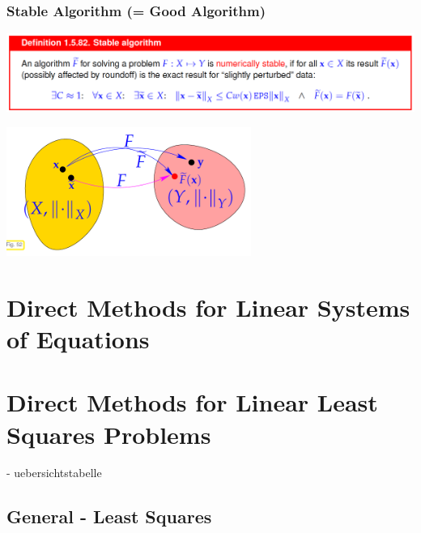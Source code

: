 \documentclass[12pt, a4paper]{article}
\begin{document}
\subsubsection{Stable Algorithm (= Good Algorithm)}
\begin{center}
	 \includegraphics[width=1.0\textwidth]{stable_algorithm1.png}
\end{center}

\begin{center}
	 \includegraphics[width=0.6\textwidth]{stable_algorithm2.png}
\end{center}

\newpage
\section{Direct Methods for Linear Systems of Equations}




\newpage
\section{Direct Methods for Linear Least Squares Problems}

- uebersichtstabelle

\subsection{General - Least Squares}
\end{document}
